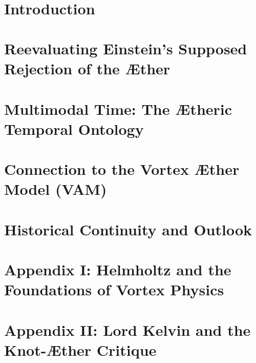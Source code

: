 \documentclass[preprint,titlepage]{revtex4-2}
\begin{document}
    \vspace{0.1em}
    \mbox{}\\

   \maketitle
    \section{Introduction}\label{sec:introduction}
    

    \section{Reevaluating Einstein’s Supposed Rejection of the Æther}\label{sec:reevaluating-einsteins-supposed-rejection-of-the-ther}
    

    \section{Multimodal Time: The Ætheric Temporal Ontology}\label{sec:multimodal-time:-the-theric-temporal-ontology}
    

    \section{Connection to the Vortex Æther Model (VAM)}\label{sec:connection_to_VAM}
    

    \section{Historical Continuity and Outlook}\label{sec:historical-continuity-and-outlook}
    

    \appendix

        \section*{Appendix I: Helmholtz and the Foundations of Vortex Physics}
            \label{appendix:helmholtz}
            


        \section*{Appendix II: Lord Kelvin and the Knot-Æther Critique}
            \label{appendix:kelvin}
            
\end{document}
